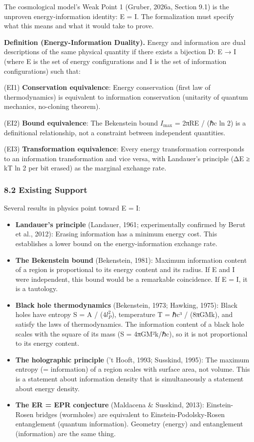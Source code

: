 \documentclass[
]{article}
\begin{document}
The cosmological model's Weak Point 1 (Gruber, 2026a, Section 9.1) is
the unproven energy-information identity: E = I. The formalization must
specify what this means and what it would take to prove.

\textbf{Definition (Energy-Information Duality).} Energy and information
are dual descriptions of the same physical quantity if there exists a
bijection D: E → I (where E is the set of energy configurations and I is
the set of information configurations) such that:

(EI1) \textbf{Conservation equivalence}: Energy conservation (first law
of thermodynamics) is equivalent to information conservation (unitarity
of quantum mechanics, no-cloning theorem).

(EI2) \textbf{Bound equivalence}: The Bekenstein bound \(I_{\max}\) =
2πRE / (ℏc ln 2) is a definitional relationship, not a constraint
between independent quantities.

(EI3) \textbf{Transformation equivalence}: Every energy transformation
corresponds to an information transformation and vice versa, with
Landauer's principle (ΔE ≥ kT ln 2 per bit erased) as the marginal
exchange rate.

\hypertarget{existing-support}{%
\subsubsection{8.2 Existing Support}\label{existing-support}}

Several results in physics point toward E = I:

\begin{itemize}
\item
  \textbf{Landauer's principle} (Landauer, 1961; experimentally
  confirmed by Berut et al., 2012): Erasing information has a minimum
  energy cost. This establishes a lower bound on the energy-information
  exchange rate.
\item
  \textbf{The Bekenstein bound} (Bekenstein, 1981): Maximum information
  content of a region is proportional to its energy content and its
  radius. If E and I were independent, this bound would be a remarkable
  coincidence. If E = I, it is a tautology.
\item
  \textbf{Black hole thermodynamics} (Bekenstein, 1973; Hawking, 1975):
  Black holes have entropy S = A / (\(4 l_P^2\)), temperature T = ℏc³ /
  (8πGMk), and satisfy the laws of thermodynamics. The information
  content of a black hole scales with the square of its mass (S =
  4πGM²k/ℏc), so it is not proportional to its energy content.
\item
  \textbf{The holographic principle} ('t Hooft, 1993; Susskind, 1995):
  The maximum entropy (= information) of a region scales with surface
  area, not volume. This is a statement about information density that
  is simultaneously a statement about energy density.
\item
  \textbf{The ER = EPR conjecture} (Maldacena \& Susskind, 2013):
  Einstein-Rosen bridges (wormholes) are equivalent to
  Einstein-Podolsky-Rosen entanglement (quantum information). Geometry
  (energy) and entanglement (information) are the same thing.
\end{itemize}
\end{document}
